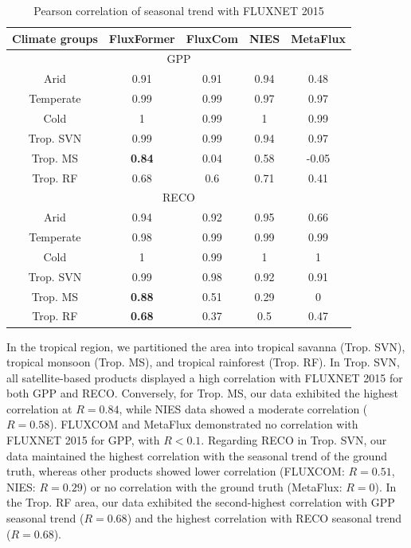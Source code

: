 \begin{table}[!ht]
    \centering
    \caption{Pearson correlation of seasonal trend with FLUXNET 2015}
    \begin{tabular}{ccccc}
        \hline
        Climate groups & FluxFormer & FluxCom & NIES & MetaFlux  \\ \hline
        \multicolumn{5}{c}{GPP}   \\ \hline 
        Arid & 0.91 & 0.91 & 0.94 & 0.48  \\ \hline 
        Temperate & 0.99 & 0.99 & 0.97 & 0.97  \\ \hline 
        Cold & 1 & 0.99 & 1 & 0.99  \\ \hline 
        Trop. SVN & 0.99 & 0.99 & 0.94 & 0.97  \\ \hline 
        Trop. MS & \textbf{0.84} & 0.04 & 0.58 & -0.05  \\ \hline 
        Trop. RF & 0.68 & 0.6 & 0.71 & 0.41  \\ \hline 
        \multicolumn{5}{c}{RECO}   \\ \hline 
        Arid & 0.94 & 0.92 & 0.95 & 0.66  \\ \hline 
        Temperate & 0.98 & 0.99 & 0.99 & 0.99  \\ \hline 
        Cold & 1 & 0.99 & 1 & 1  \\ \hline 
        Trop. SVN & 0.99 & 0.98 & 0.92 & 0.91  \\ \hline 
        Trop. MS & \textbf{0.88} & 0.51 & 0.29 & 0  \\ \hline 
        Trop. RF & \textbf{0.68} & 0.37 & 0.5 & 0.47  \\ \hline 
    \end{tabular}
    \label{tab:chap6_seasonr}
\end{table}
In the tropical region, we partitioned the area into tropical savanna (Trop. SVN), tropical monsoon (Trop. MS), and tropical rainforest (Trop. RF). In Trop. SVN, all satellite-based products displayed a high correlation with FLUXNET 2015 for both GPP and RECO. Conversely, for Trop. MS, our data exhibited the highest correlation at $R=0.84$, while NIES data showed a moderate correlation ($R=0.58$). FLUXCOM and MetaFlux demonstrated no correlation with FLUXNET 2015 for GPP, with $R<0.1$. Regarding RECO in Trop. SVN, our data maintained the highest correlation with the seasonal trend of the ground truth, whereas other products showed lower correlation (FLUXCOM: $R=0.51$, NIES: $R=0.29$) or no correlation with the ground truth (MetaFlux: $R=0$). In the Trop. RF area, our data exhibited the second-highest correlation with GPP seasonal trend ($R=0.68$) and the highest correlation with RECO seasonal trend ($R=0.68$).\par
